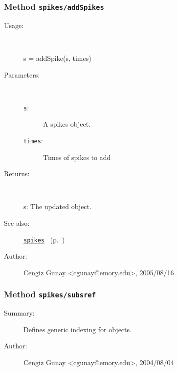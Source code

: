 \subsubsection[Method \texttt{addSpikes}]{Method \texttt{spikes/addSpikes}}%
%
\label{ref_spikes__addSpikes}%
\hypertarget{ref_spikes__addSpikes}{}%
\begin{description}
%
\item[Usage:]~%
\begin{lyxcode}%
s = addSpike(s, times)
%
\end{lyxcode}%
%
%
\item[Parameters:]~
\begin{description}%
\item[\texttt{s}:]
 A spikes object.
\item[\texttt{times}:]
 Times of spikes to add
\end{description}%
%
\item[Returns:]~

	s: The updated object.
%
%
\item[See also:]%
\hyperlink{ref_spikes}{\texttt{spikes}}%
\ (p.~\pageref{ref_spikes})%
%
%
\item[Author:]%
Cengiz Gunay <cgunay@emory.edu>, 2005/08/16%
\end{description}
\methodline%
\subsubsection[Method \texttt{subsref}]{Method \texttt{spikes/subsref}}%
%
\label{ref_spikes__subsref}%
\hypertarget{ref_spikes__subsref}{}%
\begin{description}
\item[Summary:]Defines generic indexing for objects.
%
%
%
%
%
%
%
\item[Author:]%
Cengiz Gunay <cgunay@emory.edu>, 2004/08/04%
\end{description}
\methodline%
